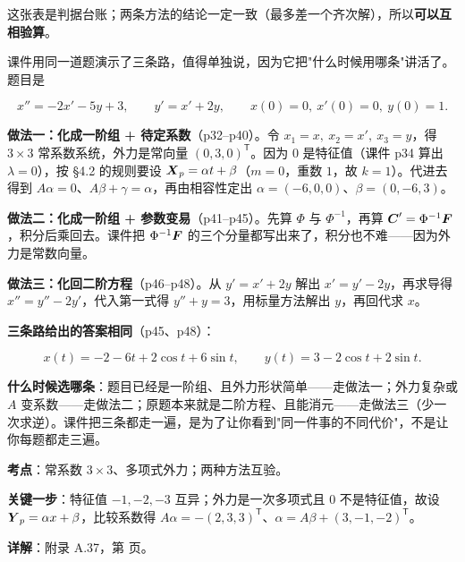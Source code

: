 \documentclass[11pt]{ctexart}
\renewcommand{\qbreak}{\needspace{0.26\textheight}}
\begin{document}
这张表是判据台账；两条方法的结论一定一致（最多差一个齐次解），所以\textbf{可以互相验算}。


课件用同一道题演示了三条路，值得单独说，因为它把"什么时候用哪条"讲活了。题目是

\[
x''=-2x'-5y+3,\qquad y'=x'+2y,\qquad x(0)=0,\ x'(0)=0,\ y(0)=1 .
\]

\textbf{做法一：化成一阶组 + 待定系数}（p32--p40）。令 $x_1=x,\ x_2=x',\ x_3=y$，得 $3\times3$ 常系数系统，外力是常向量 $(0,3,0)^{\mathsf T}$。因为 $0$ 是特征值（课件 p34 算出 $\lambda=0$），按 §4.2 的规则要设 $\boldsymbol{X}_p=\alpha t+\beta$（$m=0$，重数 $1$，故 $k=1$）。代进去得到 $A\alpha=0$、$A\beta+\gamma=\alpha$，再由相容性定出 $\alpha=(-6,0,0)$、$\beta=(0,-6,3)$。

\textbf{做法二：化成一阶组 + 参数变易}（p41--p45）。先算 $\Phi$ 与 $\Phi^{-1}$，再算 $\boldsymbol{C}'=\Phi^{-1}\boldsymbol{F}$，积分后乘回去。课件把 $\Phi^{-1}\boldsymbol{F}$ 的三个分量都写出来了，积分也不难——因为外力是常数向量。

\textbf{做法三：化回二阶方程}（p46--p48）。从 $y'=x'+2y$ 解出 $x'=y'-2y$，再求导得 $x''=y''-2y'$，代入第一式得 $y''+y=3$，用标量方法解出 $y$，再回代求 $x$。

\textbf{三条路给出的答案相同}（p45、p48）：

\[
x(t)=-2-6t+2\cos t+6\sin t,\qquad y(t)=3-2\cos t+2\sin t .
\]

\textbf{什么时候选哪条}：题目已经是一阶组、且外力形状简单——走做法一；外力复杂或 $A$ 变系数——走做法二；原题本来就是二阶方程、且能消元——走做法三（少一次求逆）。课件把三条都走一遍，是为了让你看到"同一件事的不同代价"，不是让你每题都走三遍。


\qbreak
{}
\par\textbf{考点}：常系数 $3\times3$、多项式外力；两种方法互验。
\par\textbf{关键一步}：特征值 $-1,-2,-3$ 互异；外力是一次多项式且 $0$ 不是特征值，故设 $\boldsymbol{Y}_p=\alpha x+\beta$，比较系数得 $A\alpha=-(2,3,3)^{\mathsf T}$、$\alpha=A\beta+(3,-1,-2)^{\mathsf T}$。
\par\textbf{详解}：附录 A.37，第 \pageref{c4:app:hw} 页。
\end{document}
